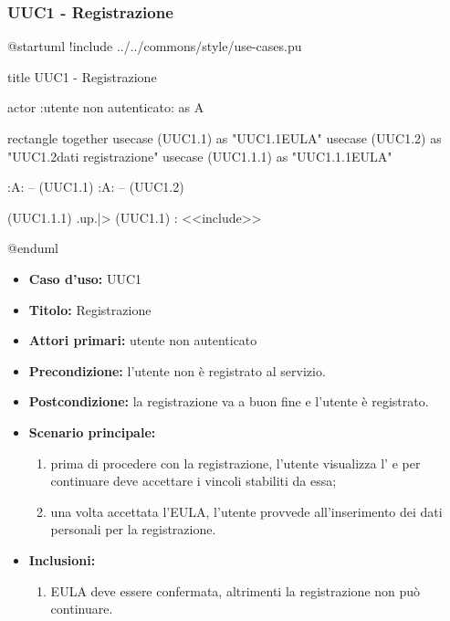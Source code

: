\documentclass[casi-duso]{subfiles}
\begin{document}
\subsubsection{UUC1 - Registrazione}%
\label{subsub:UUC1utente}

\begin{plantuml}
@startuml
!include ../../commons/style/use-cases.pu

title UUC1 - Registrazione

actor :utente non autenticato: as A

rectangle {
  together {
    usecase (UUC1.1) as "UUC1.1\nVisualizzazione EULA"
    usecase (UUC1.2) as "UUC1.2\nInserimento dati registrazione"
    usecase (UUC1.1.1) as "UUC1.1.1\nConferma EULA"
  }
}

:A: -- (UUC1.1)
:A: -- (UUC1.2)

(UUC1.1.1) .up.|> (UUC1.1) : <<include>>

@enduml
\end{plantuml}

\begin{itemize}
  \item \textbf{Caso d’uso:} UUC1
  \item \textbf{Titolo:} Registrazione
  \item \textbf{Attori primari:} utente non autenticato
  \item \textbf{Precondizione:} l'utente non è registrato al servizio.
  \item \textbf{Postcondizione:} la registrazione va a buon fine e l'utente è registrato.
  \item \textbf{Scenario principale:}
        \begin{enumerate}
          \item prima di procedere con la registrazione, l'utente visualizza l' e per continuare deve accettare i vincoli stabiliti da essa;
          \item una volta accettata l'EULA, l'utente provvede all'inserimento dei dati personali per la registrazione.
        \end{enumerate}
  \item \textbf{Inclusioni:}
        \begin{enumerate}
          \item EULA deve essere confermata, altrimenti la registrazione non può continuare.
        \end{enumerate}
\end{itemize}
\end{document}
